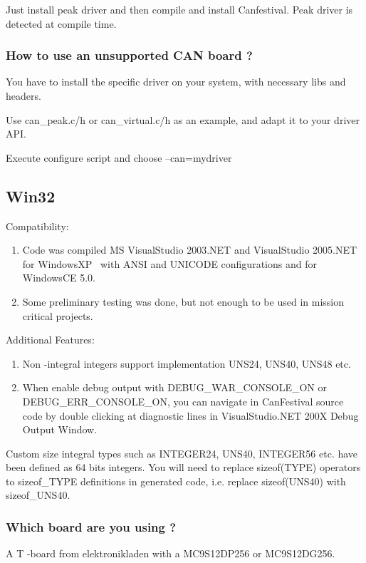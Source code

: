 \documentclass[12pt,english,a4paper]{book}
\begin{document}
Just install peak driver and then compile and install Canfestival.
Peak driver is detected at compile time.


\subsubsection{How to use an unsupported CAN board ?}

You have to install the specific driver on your system, with necessary
libs and headers.

Use can\_peak.c/h or can\_virtual.c/h as an example, and adapt it
to your driver API.

Execute configure script and choose --can=mydriver


\subsection{Win32}

Compatibility:

\begin{enumerate}
\item Code was compiled MS VisualStudio 2003.NET and VisualStudio 2005.NET
for WindowsXP \ with ANSI and UNICODE configurations and for WindowsCE
5.0. 
\item Some preliminary testing was done, but not enough to be used in mission
critical projects. 
\end{enumerate}
Additional Features:

\begin{enumerate}
\item Non -integral integers support implementation UNS24, UNS40, UNS48
etc. 
\item When enable debug output with DEBUG\_WAR\_CONSOLE\_ON or DEBUG\_ERR\_CONSOLE\_ON,
you can navigate in CanFestival source code by double clicking at
diagnostic lines in VisualStudio.NET 200X Debug Output Window. 
\end{enumerate}
Custom size integral types such as INTEGER24, UNS40, INTEGER56 etc.
have been defined as 64 bits integers. You will need to replace sizeof(TYPE)
operators to sizeof\_TYPE definitions in generated code, i.e. replace
sizeof(UNS40) with sizeof\_UNS40.

\subsubsection{Which board are you using ?}

A T -board from elektronikladen with a MC9S12DP256 or MC9S12DG256.
\end{document}
